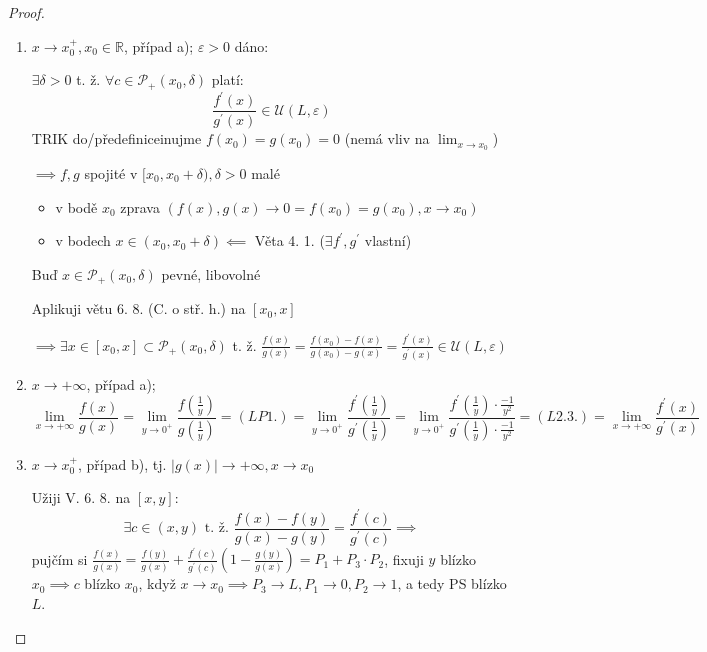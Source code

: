 \begin{proof}
  \begin{enumerate}[1.]
    \item $x \to x_0^+, x_0 \in \mathbb R$, případ a); $\varepsilon > 0$ dáno:

          $\exists \delta > 0$ t. ž. $\forall c \in \mathscr P_+(x_0, \delta)$ platí:
          $$\frac{f^\prime(x)}{g^\prime(x)} \in \mathscr U(L, \varepsilon)$$
          TRIK do/předefiniceinujme $f(x_0)=g(x_0)= 0$ (nemá vliv na $\lim_{x\to x_0}$)

          $\implies f, g$ spojité v $[x_0, x_0 + \delta), \delta > 0$ malé
          \begin{itemize}
            \item v bodě $x_0$ zprava $(f(x), g(x)\to 0 = f(x_0)= g(x_0), x \to x_0)$
            \item v bodech $x \in (x_0, x_0 + \delta) \impliedby $ Věta 4. 1. ($\exists f^\prime, g^\prime$ vlastní)
          \end{itemize}
          Buď $x \in \mathscr P_+(x_0, \delta)$ pevné, libovolné

          Aplikuji větu 6. 8. (C. o stř. h.) na $[x_0, x]$

          $\implies \exists x \in [x_0, x]\subset \mathscr P_+(x_0, \delta)$ t. ž. $\frac{f(x)}{g(x)}=\frac{f(x_0)-f(x)}{g(x_0)-g(x)} = \frac{f^\prime (x)}{g^\prime (x)} \in \mathscr U (L, \varepsilon) $
    \item $x \to +\infty$, případ a);
          $$\lim_{x \to +\infty} \frac{f(x)}{g(x)} = \lim_{y \to 0^+} \frac{f(\frac{1}{y})}{g(\frac{1}{y})} = (LP 1.) = \lim_{y \to 0^+} \frac{f^\prime(\frac{1}{y})}{g^\prime(\frac{1}{y})} = \lim_{y \to 0^+}\frac{f^\prime(\frac{1}{y})\cdot\frac{-1}{y^2}}{g^\prime(\frac{1}{y})\cdot \frac{-1}{y^2}} = (L 2. 3.) = \lim_{x \to +\infty} \frac{f^\prime(x)}{g^\prime(x)}  $$
    \item $x \to x_0^+$, případ b), tj. $|g(x)|\to +\infty, x \to x_0$

          Užiji V. 6. 8. na $[x,y]$:
          $$\exists c \in (x, y)\text{ t. ž. } \frac{f(x)-f(y)}{g(x)-g(y)}=\frac{f^\prime(c)}{g^\prime(c)} \implies $$
          pujčím si $\frac{f(x)}{g(x)} = \frac{f(y)}{g(x)}+ \frac{f^\prime (c)}{g^\prime (c)}(1- \frac{g(y)}{g(x)}) = P_1 + P_3 \cdot P_2$, fixuji $y$ blízko $x_0\implies c$ blízko $x_0$, když $x\to x_0\implies P_3 \to L, P_1 \to 0, P_2 \to 1$, a tedy PS blízko $L$.
  \end{enumerate}
\end{proof}

